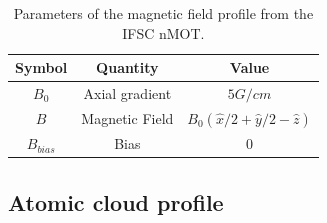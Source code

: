 \begin{table}[ht!]
    \centering
    \caption{Parameters of the magnetic field profile from the IFSC nMOT.}
    \begin{tabular}{|c|c|c|}
        \hline
        \textbf{Symbol} & \textbf{Quantity} & \textbf{Value} \\ \hline
        $ B_0 $ & Axial gradient & $ 5 G / cm $ \\
        $ B $ & Magnetic Field & $ B_0(\hat{x}/2 + \hat{y}/2 - \hat{z}) $ \\
        $ B_{bias} $ & Bias & $ 0 $ \\
        \hline
    \end{tabular}
    \vspace{10px}
    \label{tab:IFSC-magnetic-field}
\end{table}


\subsection{Atomic cloud profile}
\label{sec:cloud-profile-dysprosium}

